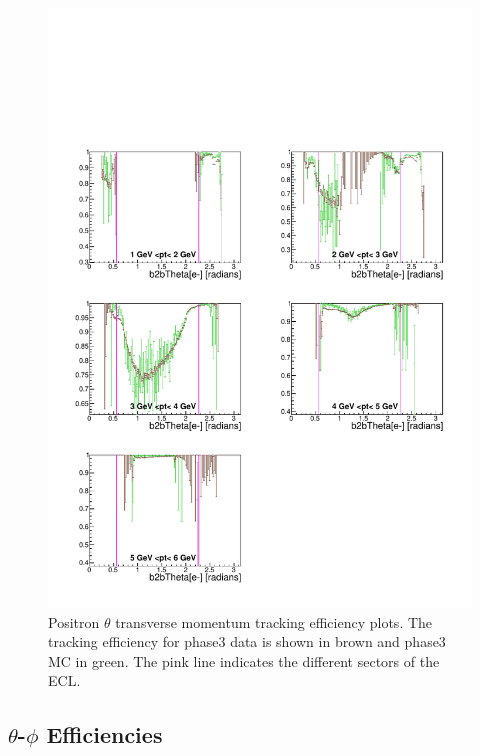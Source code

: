 \documentclass[a4paper,11pt,twosided,final,german,openbib,pdftex,listof=totoc,bibliography=totoc]{scrbook}
\begin{document}
\begin{figure}[!htbp]
	\centering
	\includegraphics[width=\textwidth]{Plots/master3/xPtMThetaepP3}
	\caption[Transverse Momentum $\theta$ Positron Efficiency Phase3]{Positron $\theta$ transverse momentum tracking efficiency plots. The tracking efficiency for phase3 data is shown in brown and phase3 MC in green. The pink line indicates the different sectors of the ECL.}
	\label{plt:xPtMThetaep3}
\end{figure}


\clearpage

\subsection{$\theta$-$\phi$ Efficiencies}
\end{document}
